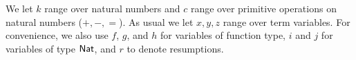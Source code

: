 \documentclass[12pt,phd,lfcs,twoside,openright,logo,leftchapter,normalheadings]{infthesis}
\theoremstyle{plain}
\theoremstyle{definition}
\begin{document}
%
We let $k$ range over natural numbers and $c$ range over primitive
operations on natural numbers ($+, -, =$).
%
As usual we let $x, y, z$ range over term variables.
%
For convenience, we also use $f$, $g$, and $h$ for variables of
function type, $i$ and $j$ for variables of type $\mathsf{Nat}$, and $r$ to
denote resumptions.
%

%
%
\end{document}
